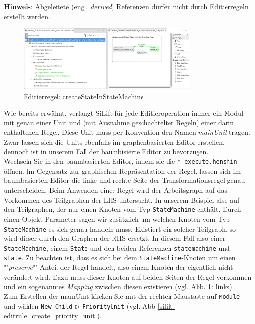 \documentclass[a4paper]{scrartcl}
\begin{document}
\textbf{Hinweis}: Abgeleitete (engl. \textit{derived}) Referenzen dürfen nicht durch Editierregeln erstellt werden.


\begin{figure}[H]
\centering
\includegraphics[width=0.8\textwidth]{graphics/silift-editrule_createStateInStateMachine.png}
\caption{Editierregel: createStateInStateMachine}
\label{silift-editrule_createStateInStateMachine}
\end{figure}

Wie bereits erwähnt, verlangt SiLift für jede Editieroperation immer ein Modul mit genau einer Unit und (mit Ausnahme geschachtelter Regeln) einer darin enthaltenen Regel.
Diese Unit muss per Konvention den Namen \textit{mainUnit} tragen.\\
Zwar lassen sich die Units ebenfalls im graphenbasierten Editor erstellen, dennoch ist in unserem Fall der baumbisierte Editor zu bevorzugen.\\
Wechseln Sie in den baumbasierten Editor, indem sie die \texttt{*\_execute.henshin} öffnen.
Im Gegensatz zur graphischen Repräsentation der Regel, lassen sich im baumbasierten Editor die linke und rechte Seite der Transformationsregel genau unterscheiden.
Beim Anwenden einer Regel wird der Arbeitsgraph auf das Vorkommen des Teilgraphen der LHS untersucht. In unserem Beispiel also auf den Teilgraphen, der nur  einen Knoten vom Typ \texttt{StateMachine} enthält.
Durch einen Objekt-Parameter sagen wir zusätzlich um welchen Knoten vom Typ \texttt{StateMachine} es sich genau handeln muss.
Existiert ein solcher Teilgraph, so wird dieser durch den Graphen der RHS ersetzt.
In diesem Fall also einer \texttt{StateMachine}, einem \texttt{State} und den beiden Referenzen \texttt{statemachine} und \texttt{state}.
Zu beachten ist, dass es sich bei dem \texttt{StateMachine}-Knoten um einen "'\textit{preserve}"'-Anteil der Regel handelt, also einem Knoten der eigentlich nicht verändert wird. 
Dazu muss dieser Knoten auf beiden Seiten der Regel vorkommen und ein sogenanntes \textit{Mapping} zwischen diesen existieren (vgl. Abb. \ref{silift-editrule_createStateInStateMachine}: links).\\
Zum Erstellen der mainUnit klicken Sie mit der rechten Maustaste auf \texttt{Module} und wählen \texttt{New Child} $\triangleright$ \texttt{PriorityUnit} (vgl. Abb \ref{silift-editrule_create_priority_unit}).
\end{document}
